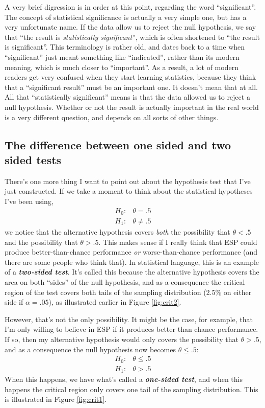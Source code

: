 \documentclass[
]{book}
\begin{document}
A very brief digression is in order at this point, regarding the word ``significant''. The concept of statistical significance is actually a very simple one, but has a very unfortunate name. If the data allow us to reject the null hypothesis, we say that ``the result is \emph{statistically significant}'', which is often shortened to ``the result is significant''. This terminology is rather old, and dates back to a time when ``significant'' just meant something like ``indicated'', rather than its modern meaning, which is much closer to ``important''. As a result, a lot of modern readers get very confused when they start learning statistics, because they think that a ``significant result'' must be an important one. It doesn't mean that at all. All that ``statistically significant'' means is that the data allowed us to reject a null hypothesis. Whether or not the result is actually important in the real world is a very different question, and depends on all sorts of other things.

\hypertarget{onesidedtests}{%
\subsection{The difference between one sided and two sided tests}\label{onesidedtests}}

There's one more thing I want to point out about the hypothesis test that I've just constructed. If we take a moment to think about the statistical hypotheses I've been using,
\[
\begin{array}{cc}
H_0 : & \theta = .5 \\
H_1 : & \theta \neq .5 
\end{array}
\]
we notice that the alternative hypothesis covers \emph{both} the possibility that \(\theta < .5\) and the possibility that \(\theta > .5\). This makes sense if I really think that ESP could produce better-than-chance performance \emph{or} worse-than-chance performance (and there are some people who think that). In statistical language, this is an example of a \textbf{\emph{two-sided test}}. It's called this because the alternative hypothesis covers the area on both ``sides'' of the null hypothesis, and as a consequence the critical region of the test covers both tails of the sampling distribution (2.5\% on either side if \(\alpha =.05\)), as illustrated earlier in Figure \ref{fig:crit2}.

However, that's not the only possibility. It might be the case, for example, that I'm only willing to believe in ESP if it produces better than chance performance. If so, then my alternative hypothesis would only covers the possibility that \(\theta > .5\), and as a consequence the null hypothesis now becomes \(\theta \leq .5\):
\[
\begin{array}{cc}
H_0 : & \theta \leq .5 \\
H_1 : & \theta > .5 
\end{array}
\]
When this happens, we have what's called a \textbf{\emph{one-sided test}}, and when this happens the critical region only covers one tail of the sampling distribution. This is illustrated in Figure \ref{fig:crit1}.
\end{document}
